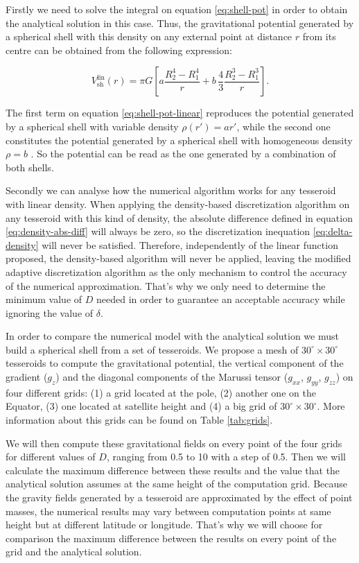 \documentclass[extra]{gji}
\begin{document}
Firstly we need to solve the integral on equation \ref{eq:shell-pot} in 
order to obtain the analytical solution in this case.
Thus, the gravitational potential generated by a spherical shell with this 
density on any external point at distance $r$ from its centre can be 
obtained from the following expression:

\begin{equation}
    V_\text{sh}^\text{lin}(r) = \pi G \left[ 
    a \frac{R_2^4 - R_1^4}{r} +
    b \,\frac{4}{3} \frac{R_2^3 - R_1^3}{r} \right].
    \label{eq:shell-pot-linear}
\end{equation}

\noindent The first term on equation \ref{eq:shell-pot-linear} 
reproduces the potential generated by a spherical shell with variable 
density $\rho(r') = ar'$, while the second one constitutes the 
potential generated by a spherical shell with homogeneous density $\rho 
= b$ \citep{Mikuska2006,Grombein2013}.
So the potential can be read as the one generated by a combination of 
both shells.

Secondly we can analyse how the numerical algorithm works for any 
tesseroid with linear density.
When applying the density-based discretization algorithm on any 
tesseroid with this kind of density, the absolute difference defined in 
equation \ref{eq:density-abs-diff} will always be zero, so the 
discretization inequation \ref{eq:delta-density} will never be 
satisfied.
Therefore, independently of the linear function proposed, the 
density-based algorithm will never be applied, leaving the modified 
adaptive discretization algorithm as the only mechanism to control the 
accuracy of the numerical approximation.
That's why we only need to determine the minimum value of $D$ needed in 
order to guarantee an acceptable accuracy while ignoring the value of 
$\delta$.

In order to compare the numerical model with the analytical solution we 
must build a spherical shell from a set of tesseroids.
We propose a mesh of $30^\circ \times 30^\circ$ tesseroids to compute 
the gravitational potential, the vertical component of the gradient 
($g_z$) and the diagonal components of the Marussi tensor ($g_{xx}$, 
$g_{yy}$, $g_{zz}$) on four different grids: (1) a grid located at the 
pole, (2) another one on the Equator, (3) one located at satellite 
height and (4) a big grid of $30^\circ \times 30^\circ$.
More information about this grids can be found on Table 
\ref{tab:grids}.

We will then compute these gravitational fields on every point of the four 
grids for different values of $D$, ranging from 0.5 to 10 with a step 
of 0.5.
Then we will calculate the maximum difference between these results and the 
value that the analytical solution assumes at the same height of the 
computation grid.
Because the gravity fields generated by a tesseroid are approximated by 
the effect of point masses, the numerical results may vary between 
computation points at same height but at different latitude or 
longitude.
That's why we will choose for comparison the maximum difference between the 
results on every point of the grid and the analytical solution.
\end{document}
